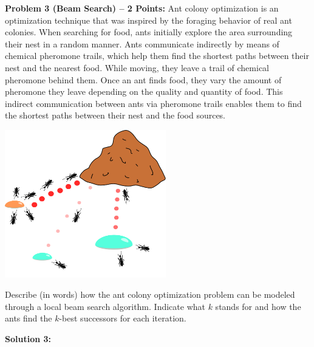 \documentclass[]{article}
\begin{document}
\textbf{Problem 3 (Beam Search) -- 2 Points:}
Ant colony optimization is an optimization technique that was inspired by the foraging behavior of real ant colonies. When searching for food, ants initially explore the area surrounding their nest in a random manner. Ants communicate indirectly by means of chemical pheromone trails, which help them find the shortest paths between their nest and the nearest food. While moving, they leave a trail of chemical pheromone behind them. Once an ant finds food, they vary the amount of pheromone they leave depending on the quality and quantity of food. This indirect communication between ants via pheromone trails enables them to find the shortest paths between their nest and the food sources.

\begin{center}
    \includegraphics[width=7cm]{ant_colony.png}
\end{center}

Describe (in words) how the ant colony optimization problem can be modeled through a local beam search algorithm. Indicate what $k$ stands for and how the ants find the $k$-best successors for each iteration.

\bigskip

\textbf{Solution 3:}
\end{document}
